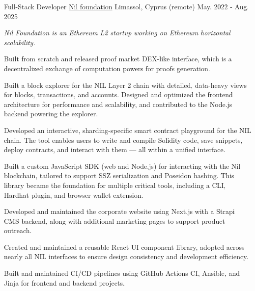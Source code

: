 \begin{cventries}
  \cventry
    {Full-Stack Developer} %
    {\href{https://nil.foundation}{Nil foundation}} %
    {Limassol, Cyprus (remote)} %
    {May. 2022 - Aug. 2025} %
    {
      \begin{cvitems} %
      \vspace{8pt}
      \item[] {\small\textit{Nil Foundation is an Ethereum L2 startup working on Ethereum horizontal scalability.}}
      \vspace{8pt}
        \item {Built from scratch and released proof market DEX-like interface, which is a decentralized exchange of computation powers for proofs generation.}
        \item {Built a block explorer for the NIL Layer 2 chain with detailed, data-heavy views for blocks, transactions, and accounts. Designed and optimized the frontend architecture for performance and scalability, and contributed to the Node.js backend powering the explorer.}
        \item {Developed an interactive, sharding-specific smart contract playground for the NIL chain. The tool enables users to write and compile Solidity code, save snippets, deploy contracts, and interact with them — all within a unified interface.}
        \item {Built a custom JavaScript SDK (web and Node.js) for interacting with the Nil blockchain, tailored to support SSZ serialization and Poseidon hashing. This library became the foundation for multiple critical tools, including a CLI, Hardhat plugin, and browser wallet extension.}
        \item {Developed and maintained the corporate website using Next.js with a Strapi CMS backend, along with additional marketing pages to support product outreach.}
        \item {Created and maintained a reusable React UI component library, adopted across nearly all NIL interfaces to ensure design consistency and development efficiency.}
        \item {Built and maintained CI/CD pipelines using GitHub Actions CI, Ansible, and Jinja for frontend and backend projects.}
      \end{cvitems}
    }
    {\vspace{24pt}}


\end{cventries}
